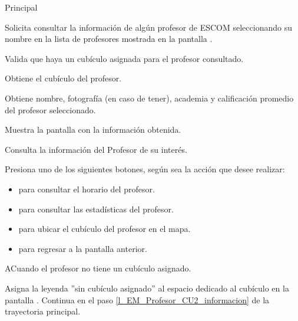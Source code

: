 \begin{UCtrayectoria}{Principal}

	\UCpaso [\UCactor] Solicita consultar la información de algún profesor de ESCOM seleccionando su nombre en la lista de profesores mostrada en la pantalla .

	\UCpaso Valida que haya un cubículo asignada para el profesor consultado.  

	\UCpaso Obtiene el cubículo del profesor.

	\UCpaso Obtiene nombre, fotografía (en caso de tener), academia y calificación promedio del profesor seleccionado. \label{l_EM_Profesor_CU2_informacion}

	\UCpaso Muestra la pantalla  con la información obtenida.

	\UCpaso[\UCactor] Consulta la información del Profesor de su interés.

	\UCpaso [\UCactor] Presiona uno de los siguientes botones, según sea la acción que desee realizar: 
	\begin{itemize}
		\item {} para consultar el horario del profesor.
		\item {} para consultar las estadísticas del profesor.
		\item {} para ubicar el cubículo del profesor en el mapa.
		\item {} para regresar a la pantalla anterior.  
	\end{itemize}

\end{UCtrayectoria}

\begin{UCtrayectoriaA}{A}{Cuando el profesor no tiene un cubículo asignado.}

	\UCpaso	Asigna la leyenda ''sin cubículo asignado'' al espacio dedicado al cubículo en la pantalla .
	\UCpaso Continua en el paso \ref{l_EM_Profesor_CU2_informacion} de la trayectoria principal.

\end{UCtrayectoriaA}
